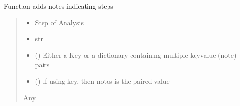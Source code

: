 \documentclass[letterpaper,10pt,english]{sphinxmanual}
\begin{document}
\begin{fulllineitems}
\begin{fulllineitems}
\label{\detokenize{ExperimentHierarchy:ExperimentHierarchy.CollectedImagingAnalysisFolder.add_notes}}
\pysigstartsignatures
{}
\pysigstopsignatures
\sphinxAtStartPar
Function adds notes indicating steps
\begin{quote}\begin{description}
\begin{itemize}
\item {} 
\sphinxAtStartPar
{} \textendash{} Step of Analysis

\item {} 
\sphinxAtStartPar
{} \textendash{} str

\item {} 
\sphinxAtStartPar
{} (\sphinxstyleliteralemphasis{\sphinxupquote{{[}}}\sphinxstyleliteralemphasis{\sphinxupquote{, }}\sphinxstyleliteralemphasis{\sphinxupquote{{]}}}) \textendash{} Either a Key or a dictionary containing multiple key\sphinxhyphen{}value (note) pairs

\item {} 
\sphinxAtStartPar
{} (\sphinxstyleliteralemphasis{\sphinxupquote{{[}}}\sphinxstyleliteralemphasis{\sphinxupquote{{]}}}) \textendash{} If using key, then notes is the paired value

\end{itemize}

\sphinxAtStartPar
Any

\end{description}\end{quote}


\end{fulllineitems}
\end{fulllineitems}
\end{document}
